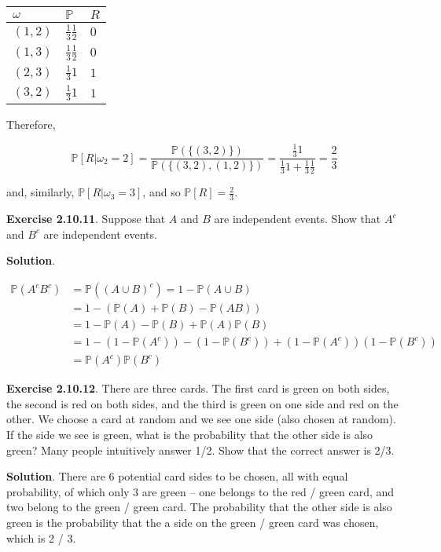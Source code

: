 \begin{longtable}[]{@{}lll@{}}
\toprule\noalign{}
\(\omega\) & \(\mathbb{P}\) & \(R\) \\
\midrule\noalign{}
\endhead
\bottomrule\noalign{}
\endlastfoot
\((1, 2)\) & \(\frac{1}{3}\frac{1}{2}\) & \(0\) \\
\((1, 3)\) & \(\frac{1}{3}\frac{1}{2}\) & \(0\) \\
\((2, 3)\) & \(\frac{1}{3} 1\) & \(1\) \\
\((3, 2)\) & \(\frac{1}{3} 1\) & \(1\) \\
\end{longtable}

Therefore,

\[\mathbb{P}[ R | \omega_2 = 2 ] = \frac{\mathbb{P}(\{(3, 2)\})}{\mathbb{P}(\{ (3, 2), (1, 2) \})}= \frac{\frac{1}{3} 1}{\frac{1}{3} 1 + \frac{1}{3}\frac{1}{2}} = \frac{2}{3}\]

and, similarly, \(\mathbb{P}[ R | \omega_3 = 3 ]\), and so
\(\mathbb{P}[R] = \frac{2}{3}\).

\textbf{Exercise 2.10.11}. Suppose that \(A\) and \(B\) are independent
events. Show that \(A^c\) and \(B^c\) are independent events.

\textbf{Solution}.

\begin{align}
\mathbb{P}(A^c B^c) &= \mathbb{P}((A \cup B)^c)  = 1 - \mathbb{P}(A \cup B) \\
&= 1 - \left( \mathbb{P}(A) + \mathbb{P}(B) - \mathbb{P}(AB) \right)  \\
&= 1 - \mathbb{P}(A) - \mathbb{P}(B) + \mathbb{P}(A) \mathbb{P}(B) \\
&= 1 - (1 - \mathbb{P}(A^c)) - (1 - \mathbb{P}(B^c)) + (1 - \mathbb{P}(A^c)) (1 - \mathbb{P}(B^c)) \\
&= \mathbb{P}(A^c) \mathbb{P}(B^c)
\end{align}

\textbf{Exercise 2.10.12}. There are three cards. The first card is
green on both sides, the second is red on both sides, and the third is
green on one side and red on the other. We choose a card at random and
we see one side (also chosen at random). If the side we see is green,
what is the probability that the other side is also green? Many people
intuitively answer 1/2. Show that the correct answer is 2/3.

\textbf{Solution}. There are 6 potential card sides to be chosen, all
with equal probability, of which only 3 are green -- one belongs to the
red / green card, and two belong to the green / green card. The
probability that the other side is also green is the probability that
the a side on the green / green card was chosen, which is 2 / 3.


